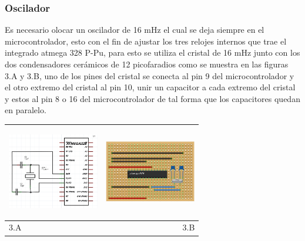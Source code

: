 \documentclass[12]{article}
\newenvironment{Figure}
{\par\medskip\noindent\minipage{\linewidth}}
{\endminipage\par\medskip}
\begin{document}
\begin{multicols}{2}
\subsubsection{Oscilador}
Es necesario olocar un oscilador de 16 mHz el cual se deja siempre en el microcontrolador, esto  con el fin de ajustar los tres relojes internos que trae el integrado atmega 328 P-Pu, para esto se utiliza el cristal de 16 mHz junto con los dos condensadores cerámicos de 12 picofaradios como se muestra en las figuras 3.A y 3.B, uno de los pines del cristal se conecta al pin 9 del microcontrolador y el otro extremo del cristal al pin 10, unir un capacitor a cada extremo del cristal y estos al pin 8 o 16 del microcontrolador de tal forma que los capacitores quedan en paralelo.\\
\begin{Figure}
\center
\begin{tabular}{|l|r|}
\hline
\includegraphics[width=4cm, height=4cm]{img/oscilaesq.png} & \includegraphics[width=4cm, height=4cm]{img/oscilapro.png} \\ \hline
3.A & 3.B \\ \hline
\end{tabular}
\label{fig:g3}
\end{Figure}

\end{multicols}
\end{document}
